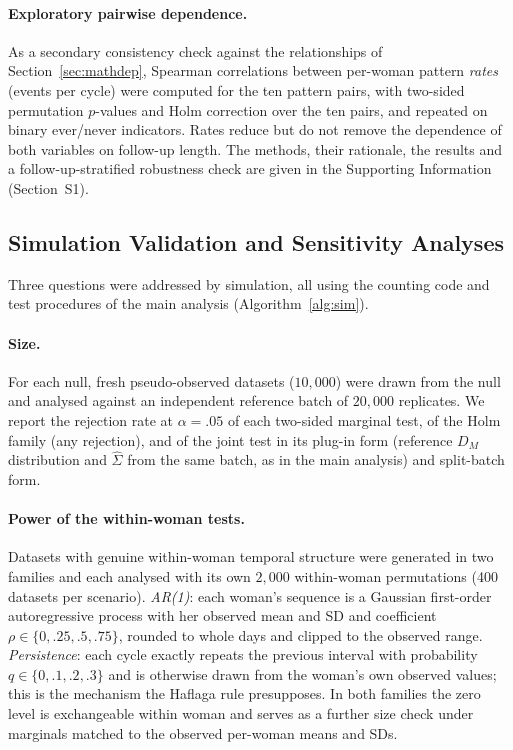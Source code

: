 \documentclass[12pt]{article}
\newcommand{\DM}{D_{M}}
\begin{document}
\paragraph{Exploratory pairwise dependence.} As a secondary consistency check against
the relationships of Section~\ref{sec:mathdep}, Spearman correlations between per-woman
pattern \emph{rates} (events per cycle) were computed for the ten pattern pairs, with
two-sided permutation $p$-values and Holm correction over the ten pairs, and repeated on
binary ever/never indicators. Rates reduce but do not remove the dependence of both
variables on follow-up length. The methods, their rationale, the results and a
follow-up-stratified robustness check are given in the Supporting Information
(Section~S1).

\subsection{Simulation Validation and Sensitivity Analyses}
\label{sec:simdesign}

Three questions were addressed by simulation, all using the counting code and test
procedures of the main analysis (Algorithm~\ref{alg:sim}).

\paragraph{Size.} For each null, fresh pseudo-observed datasets ($10{,}000$) were drawn
from the null and analysed against an independent reference batch of $20{,}000$
replicates. We report the rejection rate at $\alpha = .05$ of each two-sided marginal
test, of the Holm family (any rejection), and of the joint test in its plug-in form
(reference $\DM$ distribution and $\hat\Sigma$ from the same batch, as in the main
analysis) and split-batch form.

\paragraph{Power of the within-woman tests.} Datasets with genuine within-woman
temporal structure were generated in two families and each analysed with its own
$2{,}000$ within-woman permutations (400 datasets per scenario). \emph{AR(1)}: each
woman's sequence is a Gaussian first-order autoregressive process with her observed mean
and SD and coefficient $\rho \in \{0, .25, .5, .75\}$, rounded to whole days and clipped
to the observed range. \emph{Persistence}: each cycle exactly repeats the previous
interval with probability $q \in \{0, .1, .2, .3\}$ and is otherwise drawn from the
woman's own observed values; this is the mechanism the Haflaga rule presupposes. In both
families the zero level is exchangeable within woman and serves as a further size check
under marginals matched to the observed per-woman means and SDs.
\end{document}
